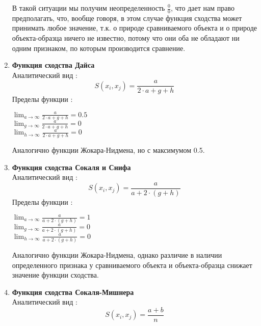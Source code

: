 \documentclass[a4paper,12pt]{article}
\begin{document}
\begin{flushleft}
\begin{enumerate}
					В такой ситуации мы получим неопределенность ${\frac{0}{0}}$, что дает нам 	право предполагать, что, вообще говоря, в этом случае функция сходства может принимать любое значение, т.к. о природе сравниваемого объекта и о природе объекта-образца ничего не известно, потому что они оба не обладают ни одним признаком, по которым производится сравнение.
			\item \textbf{Функция сходства Дайса}
				\\ Аналитический вид :
					\begin{equation}
						S(x_i,x_j) = \frac{a}{2\cdot a+g+h} 
					\end{equation}
					Пределы функции :
					\begin{center}
						${\lim_{a\to \infty} \frac{a}{2\cdot a+g+h}=0.5}$
						\\					
						\medskip						
						${\lim_{g\to \infty} \frac{a}{2\cdot a+g+h}=0}$
						\\
						\medskip						
						${\lim_{h\to \infty} \frac{a}{2\cdot a+g+h}=0}$
						\\
						\medskip						
					\end{center}
					Аналогично функции Жокара-Нидмена, но с максимумом 0.5.
			\item \textbf{Функция сходства Сокаля и Снифа}
				\\ Аналитический вид :
					\begin{equation}
						S(x_i,x_j) = \frac{a}{a + 2\cdot(g+h)} 
					\end{equation}
					Пределы функции :
					\begin{center}
						${\lim_{a\to \infty} \frac{a}{a + 2\cdot(g+h)}=1}$
						\\					
						\medskip						
						${\lim_{g\to \infty} \frac{a}{a + 2\cdot(g+h)}=0}$
						\\
						\medskip						
						${\lim_{h\to \infty} \frac{a}{a + 2\cdot(g+h)}=0}$
						\\
						\medskip					
					\end{center}
					Аналогично функции Жокара-Нидмена, однако различие в наличии определенного признака у сравниваемого объекта и объекта-образца снижает значение функции сходства.\\
			\item \textbf{Функция сходства Сокаля-Мишнера}
				\\ Аналитический вид :
					\begin{equation}
						S(x_i,x_j) = \frac{a+b}{n} 
					\end{equation}

\end{enumerate}
\end{flushleft}
\end{document}
